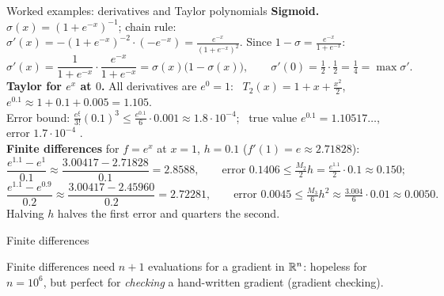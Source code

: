 \documentclass[aspectratio=1610,11pt]{beamer}
\begin{document}
\begin{frame}{Worked examples: derivatives and Taylor polynomials}
    \small
    \textbf{Sigmoid.} $\sigma(x) = (1 + e^{-x})^{-1}$; chain rule: $\sigma'(x) = -(1 + e^{-x})^{-2}\cdot(-e^{-x}) = \frac{e^{-x}}{(1 + e^{-x})^2}$. Since $1 - \sigma = \frac{e^{-x}}{1 + e^{-x}}$:
    \[\sigma'(x) = \frac{1}{1 + e^{-x}}\cdot\frac{e^{-x}}{1 + e^{-x}} = \sigma(x)\big(1 - \sigma(x)\big), \qquad \sigma'(0) = \tfrac{1}{2}\cdot\tfrac{1}{2} = \tfrac{1}{4} = \max\sigma'.\]
    \textbf{Taylor for $e^x$ at $0$.} All derivatives are $e^0 = 1$: \ $T_2(x) = 1 + x + \frac{x^2}{2}$, \ $e^{0.1} \approx 1 + 0.1 + 0.005 = 1.105$.
    \\ Error bound: $\frac{e^\xi}{3!}(0.1)^3 \leq \frac{e^{0.1}}{6}\cdot 0.001 \approx 1.8 \cdot 10^{-4}$; \ true value $e^{0.1} = 1.10517\ldots$, error $1.7 \cdot 10^{-4}$ \checkmark.
    \\[0.4em]
    \textbf{Finite differences} for $f = e^x$ at $x = 1$, $h = 0.1$ ($f'(1) = e \approx 2.71828$):
    \[\frac{e^{1.1} - e^{1}}{0.1} \approx \frac{3.00417 - 2.71828}{0.1} = 2.8588, \qquad \text{error } 0.1406 \leq \tfrac{M_2}{2}h = \tfrac{e^{1.1}}{2}\cdot 0.1 \approx 0.150;\]
    \[\frac{e^{1.1} - e^{0.9}}{0.2} \approx \frac{3.00417 - 2.45960}{0.2} = 2.72281, \qquad \text{error } 0.0045 \leq \tfrac{M_3}{6}h^2 \approx \tfrac{3.004}{6}\cdot 0.01 \approx 0.0050.\]
    Halving $h$ halves the first error and quarters the second.
\end{frame}

\begin{frame}{Finite differences}
    \begin{mlbox}
        \small Finite differences need $n + 1$ evaluations for a gradient in $\mathbb{R}^n$: hopeless for $n = 10^6$, but perfect for \emph{checking} a hand-written gradient (gradient checking).
    \end{mlbox}
\end{frame}
\end{document}
